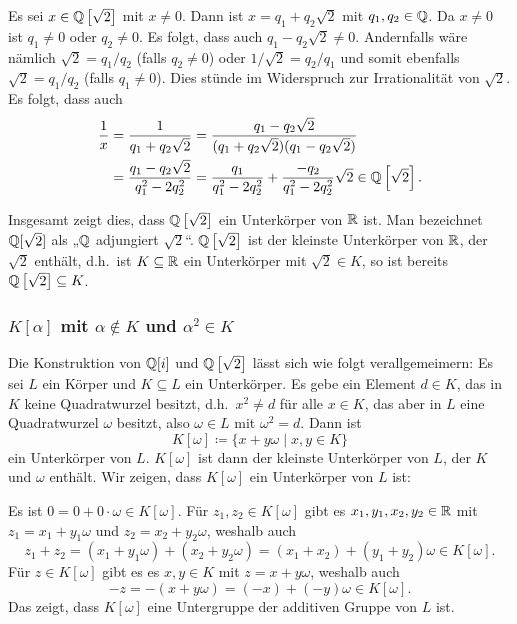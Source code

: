 Es sei $x \in \mathbb{Q}\left[\sqrt{2}\right]$ mit $x \neq 0$. Dann ist $x = q_1 + q_2 \sqrt{2}$ mit $q_1, q_2 \in \mathbb{Q}$. Da $x \neq 0$ ist $q_1 \neq 0$ oder $q_2 \neq 0$. Es folgt, dass auch $q_1 - q_2 \sqrt{2} \neq 0$. Andernfalls wäre nämlich $\sqrt{2} = q_1/q_2$ (falls $q_2 \neq 0$) oder $1/\sqrt{2} = q_2/q_1$ und somit ebenfalls $\sqrt{2} = q_1/q_2$ (falls $q_1 \neq 0$). Dies stünde im Widerspruch zur Irrationalität von $\sqrt{2}$. Es folgt, dass auch
\begin{align*}
 \frac{1}{x}
 &= \frac{1}{q_1 + q_2 \sqrt{2}}
 = \frac{q_1 - q_2 \sqrt{2}}{(q_1 + q_2 \sqrt{2})(q_1 - q_2 \sqrt{2})} \\
 &= \frac{q_1 - q_2 \sqrt{2}}{q_1^2 - 2 q_2^2}
 = \frac{q_1}{q_1^2 - 2q_2^2} + \frac{-q_2}{q_1^2 - 2q_2^2} \sqrt{2}
 \in \mathbb{Q}\left[\sqrt{2}\right].
\end{align*}

Insgesamt zeigt dies, dass $\mathbb{Q}\left[\sqrt{2}\right]$ ein Unterkörper von $\mathbb{R}$ ist. Man bezeichnet $\mathbb{Q}[\sqrt{2}]$ als „$\mathbb{Q}$ adjungiert $\sqrt{2}$“. $\mathbb{Q}\left[\sqrt{2}\right]$ ist der kleinste Unterkörper von $\mathbb{R}$, der $\sqrt{2}$ enthält, d.h.\ ist $K \subseteq \mathbb{R}$ ein Unterkörper mit $\sqrt{2} \in K$, so ist bereits $\mathbb{Q}\left[\sqrt{2}\right] \subseteq K$.


\subsubsection{\texorpdfstring{$K[\alpha]$}{K[α]} mit \texorpdfstring{$\alpha \notin K$}{α not in K} und \texorpdfstring{$\alpha^2 \in K$}{α² in K}}
Die Konstruktion von $\mathbb{Q}[i]$ und $\mathbb{Q}\left[\sqrt{2}\right]$ lässt sich wie folgt verallgemeimern: Es sei $L$ ein Körper und $K \subseteq L$ ein Unterkörper. Es gebe ein Element $d \in K$, das in $K$ keine Quadratwurzel besitzt, d.h.\ $x^2 \neq d$ für alle $x \in K$, das aber in $L$ eine Quadratwurzel $\omega$ besitzt, also $\omega \in L$ mit $\omega^2 = d$. Dann ist
\[
 K[\omega] \coloneqq \{x + y \omega \mid x,y \in K\}
\]
ein Unterkörper von $L$. $K[\omega]$ ist dann der kleinste Unterkörper von $L$, der $K$ und $\omega$ enthält. Wir zeigen, dass $K[\omega]$ ein Unterkörper von $L$ ist:

Es ist $0 = 0 + 0 \cdot \omega \in K[\omega]$. Für $z_1, z_2 \in K[\omega]$ gibt es $x_1, y_1, x_2, y_2 \in \mathbb{R}$ mit $z_1 = x_1 + y_1 \omega$ und $z_2 = x_2 + y_2 \omega$, weshalb auch
\[
 z_1 + z_2
 = (x_1 + y_1 \omega) + (x_2 + y_2 \omega)
 = (x_1 + x_2) + (y_1 + y_2) \omega
 \in K[\omega].
\]
Für $z \in K[\omega]$ gibt es es $x,y \in K$ mit $z = x+y\omega$, weshalb auch
\[
 -z = -(x + y \omega) = (-x) + (-y) \omega \in K[\omega].
\]
Das zeigt, dass $K[\omega]$ eine Untergruppe der additiven Gruppe von $L$ ist.

